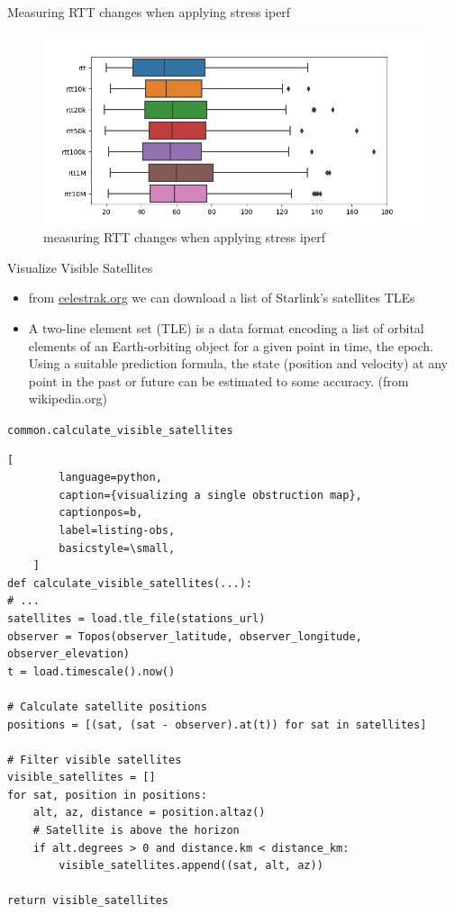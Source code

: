 \documentclass[NET,english,beameralt]{tumbeamer}
\begin{document}
\begin{frame}{Measuring RTT changes when applying stress iperf}
\begin{figure}
    \includegraphics[width=1\textwidth]{pics/rtt-iperf-stress.png}
    \caption[short]{measuring RTT changes when applying stress iperf}
\end{figure}
\end{frame}

\begin{frame}{Visualize Visible Satellites}
\begin{itemize}
    \item from \href{celestrak.org}{celestrak.org} we can download a list of Starlink's satellites TLEs
    \item A two-line element set (TLE) is a data format encoding a list of orbital elements of an Earth-orbiting object for a given point in time, the epoch. Using a suitable prediction formula, the state (position and velocity) at any point in the past or future can be estimated to some accuracy. (from wikipedia.org)
\end{itemize}
\end{frame}

\begin{frame}[fragile]{\texttt{common.calculate\_visible\_satellites}}
    \begin{lstlisting}[
        language=python,
        caption={visualizing a single obstruction map},
        captionpos=b,
        label=listing-obs,
        basicstyle=\small,
    ]
def calculate_visible_satellites(...):
# ...
satellites = load.tle_file(stations_url)
observer = Topos(observer_latitude, observer_longitude, observer_elevation)
t = load.timescale().now()

# Calculate satellite positions
positions = [(sat, (sat - observer).at(t)) for sat in satellites]

# Filter visible satellites
visible_satellites = []
for sat, position in positions:
    alt, az, distance = position.altaz()
    # Satellite is above the horizon
    if alt.degrees > 0 and distance.km < distance_km:
        visible_satellites.append((sat, alt, az))

return visible_satellites
    \end{lstlisting}
\end{frame}
\end{document}
